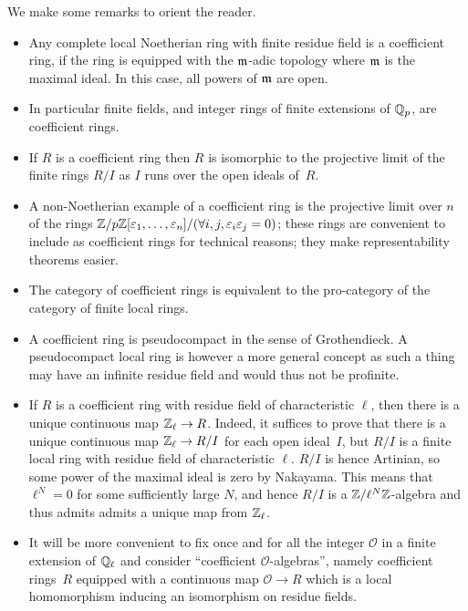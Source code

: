 \begin{remark} We make some remarks to orient the reader.
  \begin{itemize}
    \item Any complete local Noetherian ring with finite residue field is a coefficient ring,
      if the ring is equipped with the $\mathfrak{m}$-adic topology where $\mathfrak{m}$ is the maximal ideal.
      In this case, all powers of $\mathfrak{m}$ are open.
    \item In particular finite fields, and integer rings of finite extensions
      of $\mathbb{Q}_p$, are coefficient rings.
    \item If $R$ is a coefficient ring then $R$ is isomorphic to the projective limit
      of the finite rings $R/I$ as $I$ runs over the open ideals of~$R$.
    \item A non-Noetherian example of a coefficient ring is the projective limit over $n$ of
the rings $\mathbb{Z}/p\mathbb{Z}[\varepsilon_1,\ldots,\varepsilon_n]/(\forall i,j,\varepsilon_i\varepsilon_j=0)$;
these rings are convenient to include as coefficient rings for technical reasons; they make
representability theorems easier.
    \item The category of coefficient rings is equivalent to the pro-category of the
      category of finite local rings.
    \item A coefficient ring is pseudocompact in the sense of Grothendieck. A pseudocompact
      local ring is however a more general concept as such a thing may have an infinite
      residue field and would thus not be profinite.
    \item If $R$ is a coefficient ring with residue field of characteristic $\ell$,
  then there is a unique continuous map $\mathbb{Z}_\ell\to R$. Indeed, it suffices to prove that there
  is a unique continuous map $\mathbb{Z}_\ell\to R/I$ for each
  open ideal~$I$, but $R/I$ is a finite local ring with residue field of characteristic $\ell$.
  $R/I$ is hence Artinian, so some power of the maximal ideal is zero by Nakayama. This means
  that $\ell^N=0$ for some sufficiently large $N$, and hence $R/I$ is a $\mathbb{Z}/\ell^N\mathbb{Z}$-algebra
  and thus admits admits a unique map from $\mathbb{Z}_\ell$.
    \item It will be more convenient to fix once and for all the integer $\mathcal{O}$ in a
  finite extension of $\mathbb{Q}_\ell$ and consider ``coefficient $\mathcal{O}$-algebras'', namely
  coefficient rings~$R$ equipped with a continuous map $\mathcal{O}\to R$ which is a local
  homomorphism inducing an isomorphism on residue fields.
  \end{itemize}
\end{remark}

